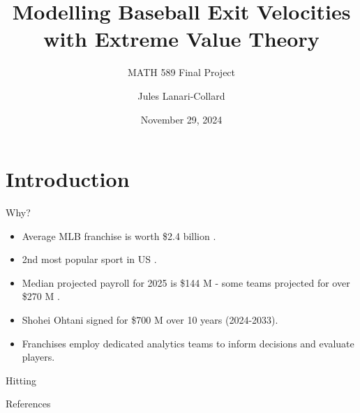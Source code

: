 \documentclass{beamer}
\title{Modelling Baseball Exit Velocities with Extreme Value Theory}
\subtitle{MATH 589 Final Project}
\author{Jules Lanari-Collard}
\institute{McGill University}
\date{November 29, 2024}
\begin{document}
\frame{\titlepage}
\section{Introduction}

\begin{frame}{Why?}
\begin{itemize}
    \item Average MLB franchise is worth \$2.4 billion \cite{forbesValuations}.
    \item 2nd most popular sport in US \cite{gallupPoll}.
    \item Median projected payroll for 2025 is \$144 M - some teams projected for over \$270 M \cite{fgRosterResource}.
    \item Shohei Ohtani signed for \$700 M over 10 years (2024-2033).
    \item Franchises employ dedicated analytics teams to inform decisions and evaluate players.
\end{itemize}
\end{frame}

\begin{frame}{Hitting}
    
\end{frame}

\begin{frame}{References}
    \printbibliography
\end{frame}
\end{document}
